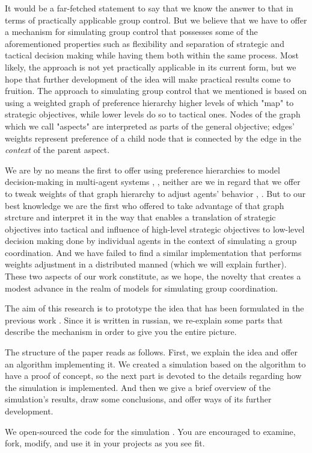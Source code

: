 
It would be a far-fetched statement to say that we know the answer to that in terms of practically applicable group control. But we believe that we have to offer a mechanism for simulating group control that possesses some of the aforementioned properties such as flexibility and separation of strategic and tactical decision making while having them both within the same process. Most likely, the approach is not yet practically applicable in its current form, but we hope that further development of the idea will make practical results come to fruition.  The approach to simulating group control that we mentioned is based on using a weighted graph of preference hierarchy higher levels of which "map" to strategic objectives, while lower levels do so to tactical ones. Nodes of the graph which we call "aspects" are interpreted as parts of the general objective; edges' weights represent preference of a child node that is connected by the edge in the \textit{context} of the parent aspect.

We are by no means the first to offer using preference hierarchies to model decision-making in multi-agent systems
\cite{cartvehishvili-2018-model}, \cite{drakaki-2018-intelligent}, neither are we in regard that we offer to tweak
weights of that graph hierarchy to adjust agents' behavior \cite{zytniewski-2016-application},
\cite{brintrup-2010-behaviour}. But to our best knowledge we are the first who offered to take advantage of that graph
strcture and interpret it in the way that enables a translation of strategic objectives into tactical and influence of
high-level strategic objectives to low-level decision making done by individual agents in the context of simulating a
group coordination. And we have failed to find a similar implementation that performs weights adjustment in a
distributed manned (which we will explain further). These two aspects of our work constitute, as we hope, the novelty
that creates a modest advance in the realm of models for simulating group coordination.

The aim of this research is to prototype the idea that has been formulated in the previous work
\cite{murashov-2021-ahp}. Since it is written in russian, we re-explain some parts that describe the mechanism in
order to give you the entire picture.

The structure of the paper reads as follows. First, we explain the idea and offer an algorithm implementing it. We
created a simulation based on the algorithm to have a proof of concept, so the next part is devoted to the details
regarding how the simulation is implemented. And then we give a brief overview of the simulation's results, draw some
conclusions, and offer ways of its further development.

We open-sourced the code for the simulation \cite{github}. You are encouraged to examine, fork, modify, and use
it in your projects as you see fit.
